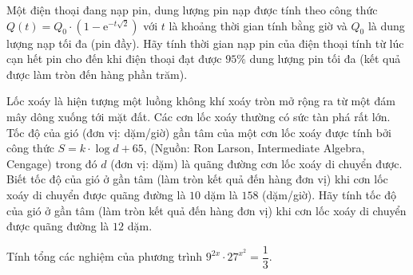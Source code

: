 \begin{ex}%
	Một điện thoại đang nạp pin, dung lượng pin nạp được tính theo công thức $Q(t)=Q_0\cdot (1-\mathrm{e}^{-t\sqrt2})$ với $t$ là khoảng thời gian tính bằng giờ và $Q_0$ là dung lượng nạp tối đa (pin đầy). Hãy tính thời gian nạp pin của điện thoại tính từ lúc cạn hết pin cho đến khi điện thoại đạt được $95\%$ dung lượng pin tối đa (kết quả được làm tròn đến hàng phần trăm).
\end{ex}

\begin{ex}%
	Lốc xoáy là hiện tượng một luồng không khí xoáy tròn mở rộng ra từ một đám mây dông xuống tới mặt đất. Các cơn lốc xoáy thường có sức tàn phá rất lớn. Tốc độ của gió (đơn vị: dặm/giờ) gần tâm của một cơn lốc xoáy được tính bởi công thức $S=k\cdot \log d+65$, (Nguồn: Ron Larson, Intermediate Algebra, Cengage) trong đó $d$ (đơn vị: dặm) là quãng đường cơn lốc xoáy di chuyển được. Biết  tốc độ của gió ở gần tâm (làm tròn kết quả đến hàng đơn vị) khi cơn lốc xoáy di chuyển được quãng đường là $10$ dặm là $158$ (dặm/giờ). Hãy tính tốc độ của gió ở gần tâm (làm tròn kết quả đến hàng đơn vị) khi cơn lốc xoáy di chuyển được quãng đường là $12$ dặm.
\end{ex}

\begin{ex}%
	Tính tổng các nghiệm của phương trình $9^{2x}\cdot 27^{x^2}=\dfrac{1}{3}$.
\end{ex}

